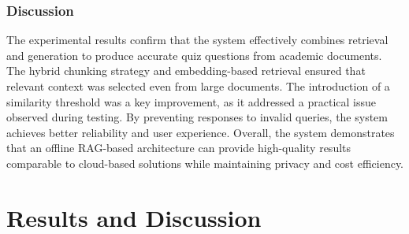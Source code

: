 \documentclass[12pt,a4paper]{report}
\begin{document}
\subsection{Discussion}
The experimental results confirm that the system effectively combines retrieval and generation to produce accurate quiz questions from academic documents. The hybrid chunking strategy and embedding-based retrieval ensured that relevant context was selected even from large documents.
The introduction of a similarity threshold was a key improvement, as it addressed a practical issue observed during testing. By preventing responses to invalid queries, the system achieves better reliability and user experience.
Overall, the system demonstrates that an offline RAG-based architecture can provide high-quality results comparable to cloud-based solutions while maintaining privacy and cost efficiency.


























\chapter{Results and Discussion}
\end{document}
